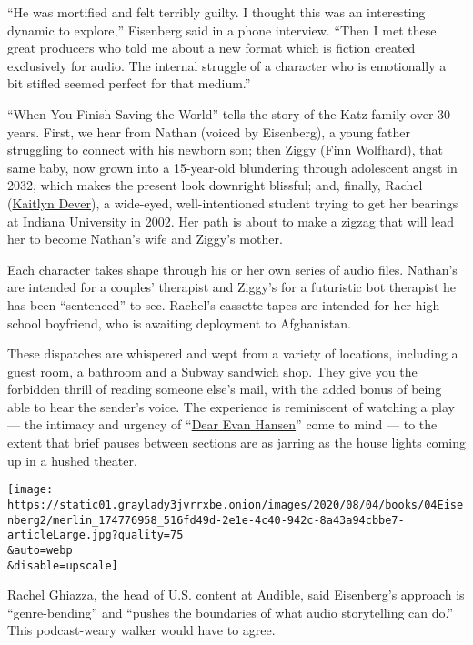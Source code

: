 ``He was mortified and felt terribly guilty. I thought this was an
interesting dynamic to explore,'' Eisenberg said in a phone interview.
``Then I met these great producers who told me about a new format which
is fiction created exclusively for audio. The internal struggle of a
character who is emotionally a bit stifled seemed perfect for that
medium.''

``When You Finish Saving the World'' tells the story of the Katz family
over 30 years. First, we hear from Nathan (voiced by Eisenberg), a young
father struggling to connect with his newborn son; then Ziggy
(\href{https://www.nytimes3xbfgragh.onion/2017/09/28/style/stranger-things-finn-wolfhard-rough-trade-vinyl.html}{Finn
Wolfhard}), that same baby, now grown into a 15-year-old blundering
through adolescent angst in 2032, which makes the present look downright
blissful; and, finally, Rachel
(\href{https://www.nytimes3xbfgragh.onion/2014/10/19/movies/kaitlyn-dever-talks-about-men-women-children.html}{Kaitlyn
Dever}), a wide-eyed, well-intentioned student trying to get her
bearings at Indiana University in 2002. Her path is about to make a
zigzag that will lead her to become Nathan's wife and Ziggy's mother.

Each character takes shape through his or her own series of audio files.
Nathan's are intended for a couples' therapist and Ziggy's for a
futuristic bot therapist he has been ``sentenced'' to see. Rachel's
cassette tapes are intended for her high school boyfriend, who is
awaiting deployment to Afghanistan.

These dispatches are whispered and wept from a variety of locations,
including a guest room, a bathroom and a Subway sandwich shop. They give
you the forbidden thrill of reading someone else's mail, with the added
bonus of being able to hear the sender's voice. The experience is
reminiscent of watching a play --- the intimacy and urgency of
``\href{https://www.nytimes3xbfgragh.onion/2016/12/04/theater/dear-evan-hansen-review.html}{Dear
Evan Hansen}'' come to mind --- to the extent that brief pauses between
sections are as jarring as the house lights coming up in a hushed
theater.

\texttt{[image: https://static01.graylady3jvrrxbe.onion/images/2020/08/04/books/04Eisenberg2/merlin\_174776958\_516fd49d-2e1e-4c40-942c-8a43a94cbbe7-articleLarge.jpg?quality=75\\\&auto=webp\\\&disable=upscale]}

Rachel Ghiazza, the head of U.S. content at Audible, said Eisenberg's
approach is ``genre-bending'' and ``pushes the boundaries of what audio
storytelling can do.'' This podcast-weary walker would have to agree.

